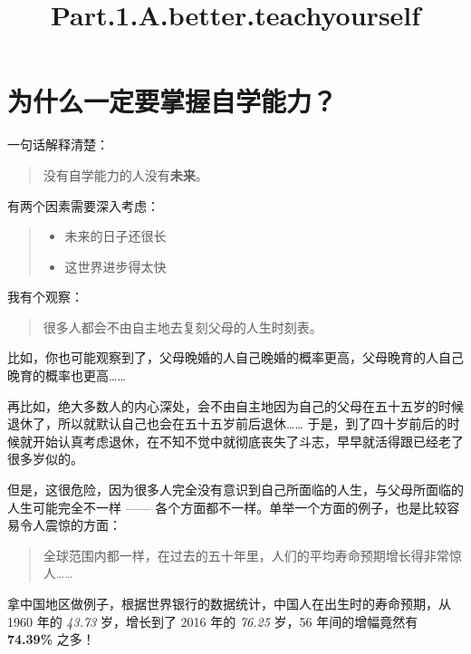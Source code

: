 \documentclass[11pt]{article}
\title{Part.1.A.better.teachyourself}
\providecommand{\tightlist}{%
      \setlength{\itemsep}{0pt}\setlength{\parskip}{0pt}}
\begin{document}
    
    
    \maketitle
    
    

    
    \section{为什么一定要掌握自学能力？}\label{ux4e3aux4ec0ux4e48ux4e00ux5b9aux8981ux638cux63e1ux81eaux5b66ux80fdux529b}

    一句话解释清楚：

\begin{quote}
没有自学能力的人没有\textbf{未来}。
\end{quote}

有两个因素需要深入考虑：

\begin{quote}
\begin{itemize}
\tightlist
\item
  未来的日子还很长
\item
  这世界进步得太快
\end{itemize}
\end{quote}

我有个观察：

\begin{quote}
很多人都会不由自主地去复刻父母的人生时刻表。
\end{quote}

比如，你也可能观察到了，父母晚婚的人自己晚婚的概率更高，父母晚育的人自己晚育的概率也更高\ldots{}\ldots{}

再比如，绝大多数人的内心深处，会不由自主地因为自己的父母在五十五岁的时候退休了，所以就默认自己也会在五十五岁前后退休\ldots{}\ldots{}
于是，到了四十岁前后的时候就开始认真考虑退休，在不知不觉中就彻底丧失了斗志，早早就活得跟已经老了很多岁似的。

但是，这很危险，因为很多人完全没有意识到自己所面临的人生，与父母所面临的人生可能完全不一样
------
各个方面都不一样。单举一个方面的例子，也是比较容易令人震惊的方面：

\begin{quote}
全球范围内都一样，在过去的五十年里，人们的平均寿命预期增长得非常惊人\ldots{}\ldots{}
\end{quote}

拿中国地区做例子，根据世界银行的数据统计，中国人在出生时的寿命预期，从
1960 年的 \emph{43.73} 岁，增长到了 2016 年的 \emph{76.25} 岁，56
年间的增幅竟然有 \textbf{74.39\%} 之多！
\end{document}
